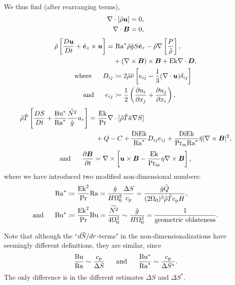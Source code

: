 \documentclass[12pt]{article}
\numberwithin{equation}{section}
\begin{document}
We thus find (after rearranging terms),
\begin{align}
	\nabla\cdot[\tilde{\rho}\bm{u}] &= 0\label{eq:contndrot},\\
	\nabla\cdot \bm{B} &= 0,
\end{align}
\begin{subequations}\label{eq:momndrot}
	\begin{align}
		\rhotilde\left[\matderiv{\vecu} + \ez\times\vecu\right] = &\ \ramod \rhotilde\gtilde S\er         -\rhotilde\nabla\left[ \frac{P}{\rhotilde} \right], \nonumber\\
		&+(\curl\vecb)\times\vecb + \ek \Div\bm{D},\\
		\where D_{ij} &\define 2\rhotilde\nutilde \left[e_{ij} - \frac{1}{3}(\Div\vecu) \delta_{ij} \right]\\
		\andd e_{ij} &\define \frac{1}{2}\left(\pderiv{u_i}{x_j} + \pderiv{u_j}{x_i} \right),
	\end{align}
\end{subequations}
\begin{align}\label{eq:enndrot}
	\tilde{\rho}\tilde{T}\left[ \frac{DS}{Dt}+ \frac{{\rm{Bu^*}}}{{\rm{Ra}}^*} \frac{\tilde{N^2}}{\tilde{g}} u_r\right]  = &\ \frac{{\rm{Ek}}}{{\rm{Pr}}} \nabla\cdot[\tilde{\rho} \tilde{T} \tilde{\kappa} \nabla S] \nonumber \\
	&+  Q-C + \frac{{\rm{Di}}{\rm{Ek}}}{{\rm{Ra}}^*} D_{ij}e_{ij} + \frac{{\rm{Di}}{\rm{Ek}}}{{\rm{Pr_m}}{\rm{Ra}}^*} \tilde{\eta}|\nabla\times\bm{B}|^2,
\end{align}
\begin{align}\label{eq:indndrot}
	\text{and}\ \ \ \ \  \frac{\partial\bm{B}}{\partial t} = \nabla\times\left[\bm{u}\times\bm{B} - \frac{{\rm{Ek}}}{{\rm{Pr_m}}} \eta\nabla\times\bm{B}\right],
\end{align}	
where we have introduced two modified non-dimensional numbers:
\begin{subequations}
	\begin{align}
		{\rm{Ra}}^* &\coloneqq \frac{{\rm{Ek}}^2}{{\rm{Pr}}}{\rm{Ra}} =  \frac{\tilde{g} }{H\Omega_0^2} \frac{\Delta S}{c_{\rm{p}}}=\frac{\tilde{g}\tilde{Q}}{(2\Omega_0)^3\tilde{\rho}\tilde{T}c_{\rm{p}} H},\\ 
		\text{and}\ \ \ \ \  {\rm{Bu^*}} &\coloneqq \frac{{\rm{Ek}}^2}{{\rm{Pr}}}{\rm{Bu}} = \frac{\widetilde{N^2}} {4\Omega_0^2} \sim \frac{\tilde{g} }{H\Omega_0^2} =  \frac{1}{\text{geometric\ oblateness}}.
	\end{align}
\end{subequations}

Note that although the ``$d\overline{S}/dr$-terms" in the non-dimensionalizations have seemingly different definitions, they are similar, since
\begin{align}
	\frac{{\rm{Bu}}}{{\rm{Ra}}} \sim \frac{c_{\rm{p}}}{\Delta S}\ \ \ \ \  \text{and}\ \ \ \ \  	\frac{{\rm{Bu^*}}}{{\rm{Ra}}^*} \sim \frac{c_{\rm{p}}}{\Delta S^*}.
\end{align}
The only difference is in the different estimates $\Delta S$ and $\Delta S^*$. 
\end{document}
